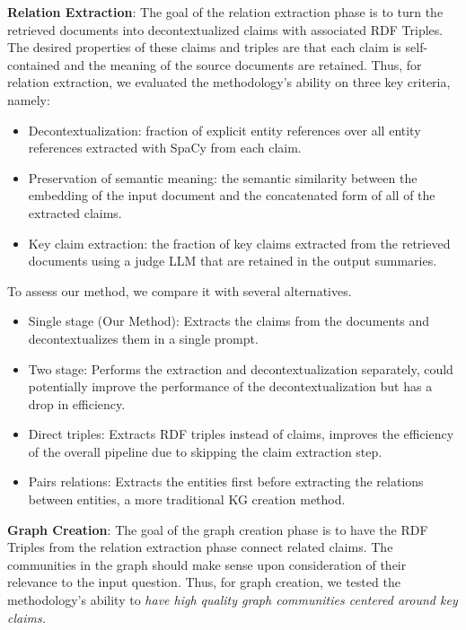 \documentclass[11pt]{article}
\theoremstyle{definition}
\begin{document}
\noindent
\textbf{Relation Extraction}: The goal of the relation extraction phase is to turn the retrieved documents into decontextualized claims with associated RDF Triples. The desired properties of these claims and triples are that each claim is self-contained and the meaning of the source documents are retained. Thus, for relation extraction, we evaluated the methodology's ability on three key criteria, namely: \\
\begin{itemize}[noitemsep,leftmargin=*]
    \item Decontextualization: fraction of explicit entity references over all entity references extracted with SpaCy from each claim. 
    \item Preservation of semantic meaning: the semantic similarity between the embedding of the input document and the concatenated form of all of the extracted claims.
    \item Key claim extraction: the fraction of key claims extracted from the retrieved documents using a judge LLM that are retained in the output summaries.
\end{itemize}

To assess our method, we compare it with several alternatives. 
\begin{itemize}[noitemsep, leftmargin=*]
    \item Single stage (Our Method): Extracts the claims from the documents and decontextualizes them in a single prompt.
    \item Two stage: Performs the extraction and decontextualization separately, could potentially improve the performance of the decontextualization but has a drop in efficiency.
    \item Direct triples: Extracts RDF triples instead of claims, improves the efficiency of the overall pipeline due to skipping the claim extraction step.
    \item Pairs relations: Extracts the entities first before extracting the relations between entities, a more traditional KG creation method.
\end{itemize}

\noindent
\textbf{Graph Creation}: The goal of the graph creation phase is to have the RDF Triples from the relation extraction phase connect related claims. The communities in the graph should make sense upon consideration of their relevance to the input question. Thus, for graph creation, we tested the methodology's ability to \textit{have high quality graph communities centered around key claims.} 
\end{document}
